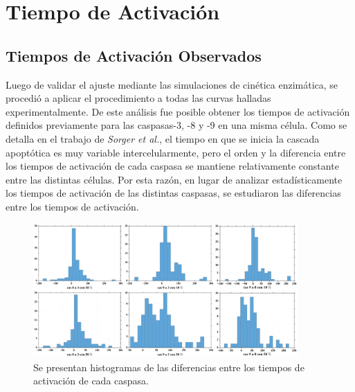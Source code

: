 

\section{Tiempo de Activación}

\subsection{Tiempos de Activación Observados}
Luego de validar el ajuste mediante las simulaciones de cinética enzimática, se procedió a aplicar el procedimiento a todas las curvas halladas experimentalmente. De este análisis fue posible obtener los tiempos de activación definidos previamente para las caspasas-3, -8 y -9 en una misma célula. Como se detalla en el trabajo de \textit{Sorger et al.}\cite{Sorger2008}, el tiempo en que se inicia la cascada apoptótica es muy variable intercelularmente, pero el orden y la diferencia entre los tiempos de activación de cada caspasa se mantiene relativamente constante entre las distintas células. Por esta razón, en lugar de analizar estadísticamente los tiempos de activación de las distintas caspasas, se estudiaron las diferencias entre los tiempos de activación.

\begin{figure}
    \centering
    \includegraphics[width=0.9\textwidth]{./img/Cap4/HistTimes.png}
    \caption{Se presentan histogramas de las diferencias entre los tiempos de activación de cada caspasa. }
    \label{fig:OneCasp_reg_anis}
\end{figure}

